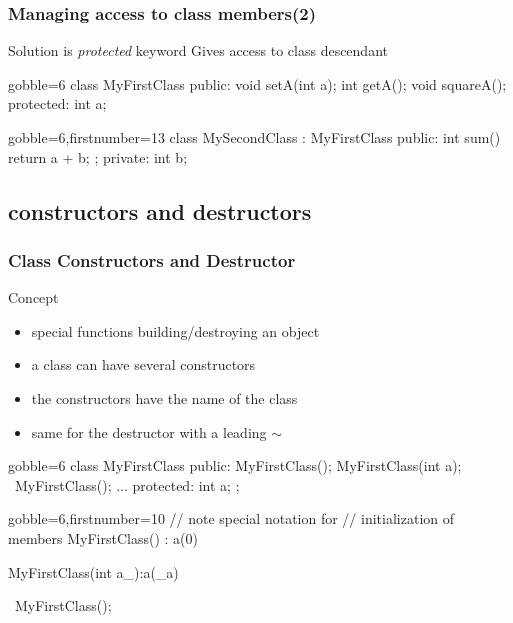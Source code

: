 \begin{frame}[fragile]
  \frametitle{Managing access to class members(2)}
  \begin{block}{Solution is {\it protected} keyword}
    Gives access to class descendant
  \end{block}
  \begin{multicols}{2}
    \begin{cppcode*}{gobble=6}
      class MyFirstClass {
      public:
        void setA(int a);
        int getA();
        void squareA();
      protected:
        int a;
      }
    \end{cppcode*}
    \columnbreak
    \begin{cppcode*}{gobble=6,firstnumber=13}
      class MySecondClass :
        MyFirstClass {
      public:
        int sum() {
          return a + b;
        };
      private:
        int b;
      }
    \end{cppcode*}
  \end{multicols}
\end{frame}


\subsection{constructors and destructors}


\begin{frame}[fragile]
  \frametitle{Class Constructors and Destructor}
  \begin{block}{Concept}
    \begin{itemize}
    \item special functions building/destroying an object
    \item a class can have several constructors
    \item the constructors have the name of the class
    \item same for the destructor with a leading $\sim$
    \end{itemize}
  \end{block}
  \begin{multicols}{2}
    \begin{cppcode*}{gobble=6}
      class MyFirstClass {
      public:
        MyFirstClass();
        MyFirstClass(int a);
        ~MyFirstClass();
        ...
      protected:
        int a;
      };
    \end{cppcode*}
    \columnbreak
    \begin{cppcode*}{gobble=6,firstnumber=10}
      // note special notation for
      // initialization of members
      MyFirstClass() : a(0) {}
      
      MyFirstClass(int a_):a(_a) {}

      ~MyFirstClass(){};
    \end{cppcode*}
  \end{multicols}
\end{frame}


